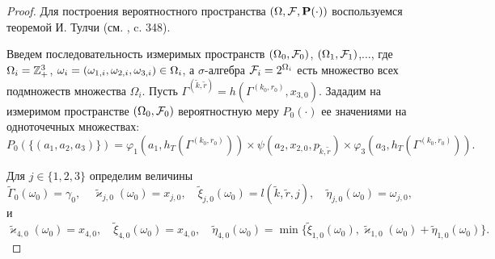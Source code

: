 \documentclass[12pt]{extarticle}
\theoremstyle{theorem}
\theoremstyle{remark}
\renewcommand*{\hm}[1]{#1\nobreak\discretionary{}%
	{\hbox{$\mathsurround=0pt #1$}}{}}%
\renewcommand{\Pr}{{\mathbf P}}
\begin{document}
\begin{proof}

Для построения вероятностного пространства $(\Omega, {\cal F}, \Pr(\cdot))$ воспользуемся теоремой И. Тулчи (см. \cite{Shiryaev}, c. 348). 

Введем последовательность измеримых пространств $(\Omega_0, {\cal F}_0)$, $(\Omega_1, {\cal F}_1)$,$\ldots$, где $\Omega_i\hm=\mathbb{Z}_+^3$, $\omega_i=(\omega_{1,i},\omega_{2,i},\omega_{3,i}) \hm\in \Omega_i$, а $\sigma$-алгебра ${\cal F}_i=2^{\Omega_i}$  есть множество всех подмножеств множества $\Omega_i$. 
Пусть $\Gamma^{(\tilde{k},\tilde{r})}=h(\Gamma^{(k_0,r_0)},x_{3,0})$.
Зададим на измеримом пространстве $(\Omega_0, {\cal F}_0)$ вероятностную меру $P_0(\cdot)$ ее значениями на одноточечных множествах:
\begin{equation}
P_0(\{(a_1,a_2,a_3)\})=\varphi_1(a_1,h_T(\Gamma^{(k_0,r_0)})) \times \psi(a_2,x_{2,0}, p_{\tilde{k},\tilde{r}}) \times \varphi_3(a_3,h_T(\Gamma^{(k_0,r_0)})).
\label{probabilitiesOne}
\end{equation}

Для $j\in \{1,2,3\}$ определим величины
\begin{equation}
\tilde{\Gamma}_0(\omega_0)=\gamma_0, \quad \tilde{\varkappa}_{j,0}(\omega_0)=x_{j,0}, \quad \tilde{\xi}_{j,0}(\omega_0)=l(\tilde{k},\tilde{r},j), \quad \tilde{\eta}_{j,0}(\omega_0)=\omega_{j,0},
\label{startRekOne}
\end{equation}
и
\begin{equation}
 \tilde{\varkappa}_{4,0}(\omega_0)=x_{4,0}, \quad \tilde{\xi}_{4,0}(\omega_0)=x_{4,0}, \quad \tilde{\eta}_{4,0}(\omega_0)=\min\{\tilde{\xi}_{1,0}(\omega_0), \tilde{\varkappa}_{1,0}(\omega_0)+\tilde{\eta}_{1,0}(\omega_0)\}.
\label{startRekTwo}
\end{equation}


\end{proof}
\end{document}
